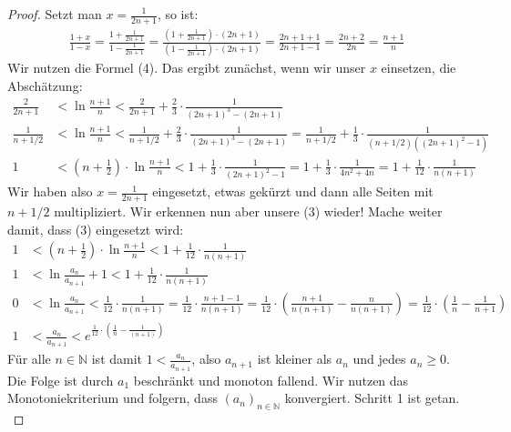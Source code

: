\documentclass[10pt,fleqn]{article}
\theoremstyle{definition}
\theoremstyle{remark}
\begin{document}
\begin{proof}
    Setzt man \(x = \frac{1}{2n+1}\), so ist:
    \begin{align*}
        \frac{1+x}{1-x} = \frac{1 + \frac{1}{2n+1}}{1 - \frac{1}{2n+1}} = \frac{\left(1 + \frac{1}{2n+1}\right) \cdot (2n+1)}{\left(1 - \frac{1}{2n+1}\right) \cdot (2n+1)} = \frac{2n + 1 + 1}{2n + 1 - 1} = \frac{2n+2}{2n} = \frac{n+1}{n}
    \end{align*}
    Wir nutzen die Formel (4). Das ergibt zunächst, wenn wir unser \(x\) einsetzen, die Abschätzung:
    \begin{align*}
        \frac{2}{2n+1} &< \ln{\frac{n+1}{n}} < \frac{2}{2n+1} + \frac{2}{3} \cdot \frac{1}{(2n+1)^3-(2n+1)}\\
        \frac{1}{n+1/2} &< \ln{\frac{n+1}{n}} < \frac{1}{n+1/2} + \frac{2}{3} \cdot \frac{1}{(2n+1)^3-(2n+1)} = \frac{1}{n+1/2} + \frac{1}{3} \cdot \frac{1}{(n+1/2)((2n+1)^2-1)}\\
        1 &< \left(n + \frac{1}{2}\right) \cdot \ln{\frac{n+1}{n}} < 1 + \frac{1}{3} \cdot \frac{1}{(2n+1)^2-1} = 1 + \frac{1}{3} \cdot \frac{1}{4n^2+4n} = 1 + \frac{1}{12} \cdot \frac{1}{n(n+1)}
    \end{align*}
    Wir haben also \(x = \frac{1}{2n+1}\) eingesetzt, etwas gekürzt und dann alle Seiten mit \(n + 1/2\) multipliziert. Wir erkennen nun aber unsere (3) wieder! Mache weiter damit, dass (3) eingesetzt wird:
    \begin{align*}
        1 &< \left(n + \frac{1}{2}\right) \cdot \ln{\frac{n+1}{n}} < 1 + \frac{1}{12} \cdot \frac{1}{n(n+1)}\\
        1 &< \ln{\frac{a_n}{a_{n+1}}} + 1 < 1 + \frac{1}{12} \cdot \frac{1}{n(n+1)}\\
        0 &< \ln{\frac{a_n}{a_{n+1}}} < \frac{1}{12} \cdot \frac{1}{n(n+1)} = \frac{1}{12} \cdot \frac{n+1-1}{n(n+1)} = \frac{1}{12} \cdot \left(\frac{n+1}{n(n+1)}-\frac{n}{n(n+1)}\right) = \frac{1}{12} \cdot \left(\frac{1}{n}-\frac{1}{n+1}\right)\\
        1 &< \frac{a_n}{a_{n+1}} < e^{\frac{1}{12} \cdot \left(\frac{1}{n}-\frac{1}{(n+1)}\right)}
    \end{align*}
    Für alle \(n \in \mathbb{N}\) ist damit \(1 < \frac{a_n}{a_{n+1}}\), also \(a_{n+1}\) ist kleiner als \(a_n\) und jedes \(a_n \geq 0\). Die Folge ist durch \(a_1\) beschränkt und monoton fallend. Wir nutzen das Monotoniekriterium und folgern, dass \((a_n)_{n \in \mathbb{N}}\) konvergiert. Schritt 1 ist getan.\\
    

\end{proof}
\end{document}
